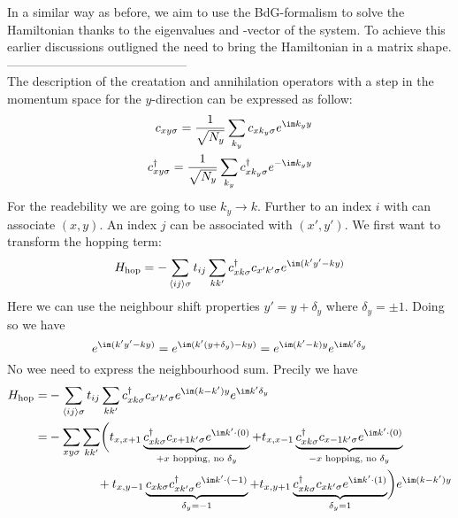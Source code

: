 \documentclass[../main.tex]{subfile}
\begin{document}
In a similar way as before, we aim to use the BdG-formalism to solve the Hamiltonian thanks to the eigenvalues and -vector of the system.
To achieve this earlier discussions outligned the need to bring the Hamiltonian in a matrix shape.\\



--------------------------------------------\\
The description of the creatation and annihilation operators with a step in the momentum space for the $y$-direction can be expressed as follow:
\begin{align}
    c_{xy\sigma} = \frac{1}{\sqrt{N_y}} \sum_{k_y} c_{x k_y\sigma} e^{\im k_y y} \label{eq:C_Foruier}\\
    c^{\dagger}_{xy\sigma} = \frac{1}{\sqrt{N_y}} \sum_{k_y} c^{\dagger}_{x k_y\sigma} e^{-\im k_y y}\label{eq:C_dagg_Foruier}
\end{align}
For the readebility we are going to use $k_y \rightarrow k$. Further to an index $i$ with can associate $(x,y)$. An index $j$ can be associated with $(x',y')$.
We first want to transform the hopping term:
\begin{equation*}
    H_{\text{hop}} = -\sum_{\langle ij\rangle \sigma} t_{ij} \sum_{kk'} c^{\dagger}_{x k\sigma} c_{x' k'\sigma} e^{\im (k' y' - k y)}
\end{equation*}
Here we can use the neighbour shift properties $y' = y + \delta_y$ where $\delta_y = \pm 1$. Doing so we have 
\[
    e^{\im (k' y' - k y)} = e^{\im (k' (y+\delta_y) -  k y)} = e^{\im (k' -  k)y}e^{\im k'\delta_y}
\]
No wee need to express the neighbourhood sum. Precily we have
\begin{align*}
        H_{\text{hop}} =& -\sum_{\langle ij\rangle \sigma} t_{ij} \sum_{kk'} c^{\dagger}_{x k\sigma} c_{x' k'\sigma}  e^{\im (k -  k')y}e^{\im k'\delta_y}\\
                        =& -\sum_{xy \sigma} \sum_{kk'}  \biggl( t_{x,x+1} \underbrace{c_{x k\sigma}^{\dagger} c_{x+1 k'\sigma}e^{\im k'\cdot (0)}}_{\text{$+x$ hopping, no $\delta_y$}} +  t_{x,x-1} \underbrace{c_{x k\sigma}^{\dagger} c_{x-1 k'\sigma} e^{\im k'\cdot (0)}}_{\text{$-x$ hopping, no $\delta_y$}}\\
                        & ~~~~~~~~~~~~+t_{x,y-1} \underbrace{c_{x k\sigma} c_{x k'\sigma}^{\dagger} e^{\im k'\cdot (-1)}}_{\delta_y = -1} + t_{x,y+1} \underbrace{c_{x k\sigma}^{\dagger} c_{x k'\sigma}e^{\im k'\cdot (1)}}_{\delta_y = 1}\biggr)e^{\im (k -  k')y}
\end{align*}
\end{document}
